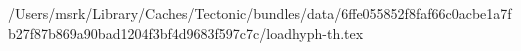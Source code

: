 /Users/msrk/Library/Caches/Tectonic/bundles/data/6ffe055852f8faf66c0acbe1a7fb27f87b869a90bad1204f3bf4d9683f597c7c/loadhyph-th.tex